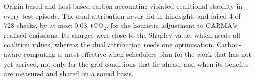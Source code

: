 Origin-based and host-based carbon accounting violated coalitional stability in every test episode. The dual attribution never did in hindsight, and failed 4 of 728 checks, by at most 0.03~tCO$_2$, for the heuristic adjustment to CARMA's realised emissions. Its charges were close to the Shapley value, which needs all coalition values, whereas the dual attribution needs one optimisation. Carbon-aware computing is most effective when schedulers plan for the work that has not yet arrived, not only for the grid conditions that lie ahead, and when its benefits are measured and shared on a sound basis.
